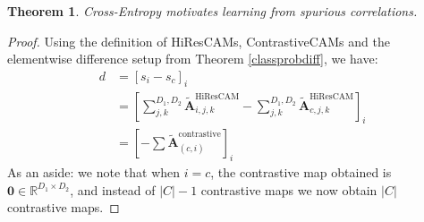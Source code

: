 \documentclass{article}
\theoremstyle{plain}
\newtheorem{theorem}{Theorem}[section]
\theoremstyle{definition}
\theoremstyle{remark}
\newcommand{\contcam}[2]{\tilde{\mathcal{\bm{A}}}^{\text{contrastive}}_{(#1, #2)}}
\begin{document}
\begin{theorem}\label{ce-spur-corr}
	Cross-Entropy motivates learning from spurious correlations.
\end{theorem}
\begin{proof} Using the definition of HiResCAMs, ContrastiveCAMs and the elementwise difference setup from Theorem \ref{classprobdiff}, we have:
	\begin{align}
		d &= [s_i - s_c]_i \\
		&= \left[\sum^{D_1,D_2}_{j,k} \tilde{\mathcal{\bm{A}}}_{i,j,k}^{\text{HiResCAM}} - \sum^{D_1,D_2}_{j,k} \tilde{\mathcal{\bm{A}}}_{c,j,k}^{\text{HiResCAM}}\right]_i \\
		&= \left[ -\sum \contcam{c}{i} \right]_i
	\end{align}
	As an aside: we note that when $i = c$, the contrastive map obtained is $\bm{0} \in \mathbb{R}^{D_1 \times D_2}$, and instead of $|C| - 1$ contrastive maps we now obtain $|C|$ contrastive maps.


\end{proof}
\end{document}
